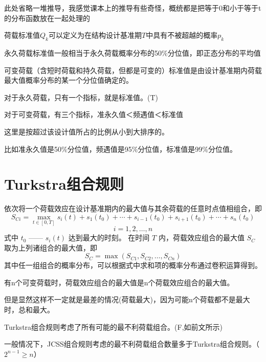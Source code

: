 \documentclass[12pt, a4paper, oneside, UTF8]{ctexbook}
\begin{document}
\begin{remark}
    此处省略一堆推导，我感觉课本上的推导有些奇怪，概统都是把等于0和小于等于t的分布函数放在一起处理的
\end{remark}

荷载标准值$Q_k$可以定义为在结构设计基准期$T$中具有不被超越的概率$p_k$

永久荷载标准值一般相当于永久荷载概率分布的50\%分位值，即正态分布的平均值

可变荷载（含短时荷载和持久荷载，但都是可变的）标准值是由设计基准期内荷载最大值概率分布的某一个分位值确定的。

\begin{example}
    对于永久荷载，只有一个指标，就是标准值。(T)
\end{example}

\begin{corollary}
    对于可变荷载，有三个指标，准永久值＜频遇值＜标准值

    这里是按超过该设计值所占的比例从小到大排序的。
    
    比如准永久值是50\%分位值，频遇值是95\%分位值，标准值是99\%分位值。
\end{corollary}

\section{Turkstra组合规则}

\begin{theorem}
    依次将一个荷载效应在设计基准期内的最大值与其余荷载的任意时点值相组合，即
\[
S_{Ci} = \max_{t \in [0, T]} s_i(t) + s_1(t_0) + \cdots + s_{i-1}(t_0) + s_{i+1}(t_0) + \cdots + s_n(t_0)
\]
\[
i = 1, 2, \ldots, n 
\]
式中 \( t_0 \) —— \( s_i(t) \) 达到最大的时刻。
在时间 \( T \) 内，荷载效应组合的最大值 \( S_C \) 取为上列诸组合的最大值，即
\[
S_C = \max(S_{C1}, S_{C2}, \ldots, S_{Cn}) 
\]
其中任一组组合的概率分布，可以根据式中求和项的概率分布通过卷积运算得到。
\end{theorem}

\begin{remark}
    有n个可变荷载时，荷载效应组合的最大值是n个荷载效应组合的最大值。

    但是显然这样不一定就是最差的情况(荷载最大)，因为可能n个荷载都不是最大时，总和最大。
\end{remark}


\begin{example}
    Turkstra组合规则考虑了所有可能的最不利荷载组合。(F,如前文所示)

一般情况下，JCSS组合规则考虑的最不利荷载组合数量多于Turkstra组合规则。（$2^{n-1} \ge n$）
\end{example}
\end{document}
